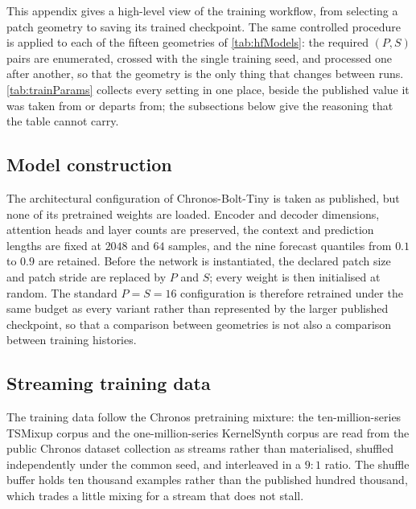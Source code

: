 This appendix gives a high-level view of the training workflow, from selecting a patch geometry to saving its trained checkpoint. The same controlled procedure is applied to each of the fifteen geometries of \autoref{tab:hfModels}: the required $(P,S)$ pairs are enumerated, crossed with the single training seed, and processed one after another, so that the geometry is the only thing that changes between runs. \autoref{tab:trainParams} collects every setting in one place, beside the published value it was taken from or departs from; the subsections below give the reasoning that the table cannot carry.



\subsection{Model construction}

The architectural configuration of Chronos-Bolt-Tiny \autocite{AmazonChronosbolttinyHugging2025,FastAccurateZeroshot2024a} is taken as published, but none of its pretrained weights are loaded. Encoder and decoder dimensions, attention heads and layer counts are preserved, the context and prediction lengths are fixed at $2048$ and $64$ samples, and the nine forecast quantiles from $0.1$ to $0.9$ are retained. Before the network is instantiated, the declared patch size and patch stride are replaced by $P$ and $S$; every weight is then initialised at random. The standard $P=S=16$ configuration is therefore retrained under the same budget as every variant rather than represented by the larger published checkpoint, so that a comparison between geometries is not also a comparison between training histories.

\subsection{Streaming training data}

The training data follow the Chronos pretraining mixture\autocite{ansariChronosLearningLanguage2024,autogluonChronosDatasets2024}: the ten-million-series TSMixup corpus and the one-million-series KernelSynth corpus are read from the public Chronos dataset collection as streams rather than materialised, shuffled independently under the common seed, and interleaved in a $9{:}1$ ratio. The shuffle buffer holds ten thousand examples rather than the published hundred thousand, which trades a little mixing for a stream that does not stall.

